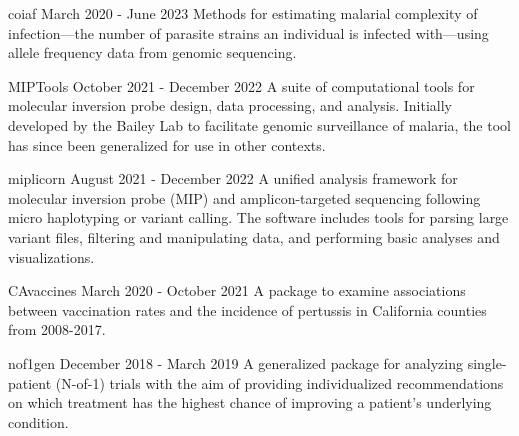 
\begin{cvprojects}

  \cvproject
  {coiaf} %
  {March 2020 - June 2023} %
  {
    Methods for estimating malarial complexity of infection—the number of
    parasite strains an individual is infected with—using allele frequency data
    from genomic sequencing.
  } %

  \cvproject
  {MIPTools}
  {October 2021 - December 2022}
  {
    A suite of computational tools for molecular inversion probe design, data
    processing, and analysis. Initially developed by the Bailey Lab to
    facilitate genomic surveillance of malaria, the tool has since been
    generalized for use in other contexts.
  }

  \cvproject
  {miplicorn} %
  {August 2021 - December 2022} %
  {
    A unified analysis framework for molecular inversion probe (MIP) and
    amplicon-targeted sequencing following micro haplotyping or variant
    calling. The software includes tools for parsing large variant files,
    filtering and manipulating data, and performing basic analyses and
    visualizations.
  } %

  \cvproject
  {CAvaccines}
  {March 2020 - October 2021}
  {
    A package to examine associations between vaccination rates and the
    incidence of pertussis in California counties from 2008-2017.
  }

  \cvproject
  {nof1gen}
  {December 2018 - March 2019}
  {
    A generalized package for analyzing single-patient (N-of-1) trials with the
    aim of providing individualized recommendations on which treatment has the
    highest chance of improving a patient's underlying condition.
  }

\end{cvprojects}
